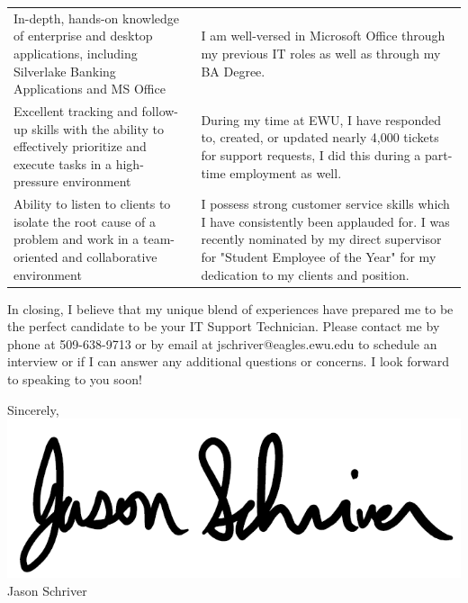 \documentclass[a4paper,10pt]{article}
\begin{document}
\begin{longtable}{|p{.35\linewidth}|p{.6\linewidth}|}
In-depth, hands-on knowledge of enterprise and desktop applications, including Silverlake Banking Applications and MS Office
& I am well-versed in Microsoft Office through my previous IT roles as well as through my BA Degree.\\

Excellent tracking and follow-up skills with the ability to effectively prioritize and execute tasks in a high-pressure environment
& During my time at EWU, I have responded to, created, or updated nearly 4,000 tickets for support requests, I did this during a part-time employment as well.\\

Ability to listen to clients to isolate the root cause of a problem and work in a team-oriented and collaborative environment
& I possess strong customer service skills which I have consistently been applauded for. I was recently nominated by my direct supervisor for "Student Employee of the Year" for my dedication to my clients and position.\\

\end{longtable}
\par
In closing, I believe that my unique blend of experiences have prepared me to be the perfect candidate to be your IT Support Technician. Please contact me by phone at 509-638-9713 or by email at jschriver@eagles.ewu.edu to schedule an interview or if I can answer any additional questions or concerns. I look forward to speaking to you soon!
\par
Sincerely,\\
\includegraphics[scale=.25]{signature}\\
Jason Schriver

\end{document}
